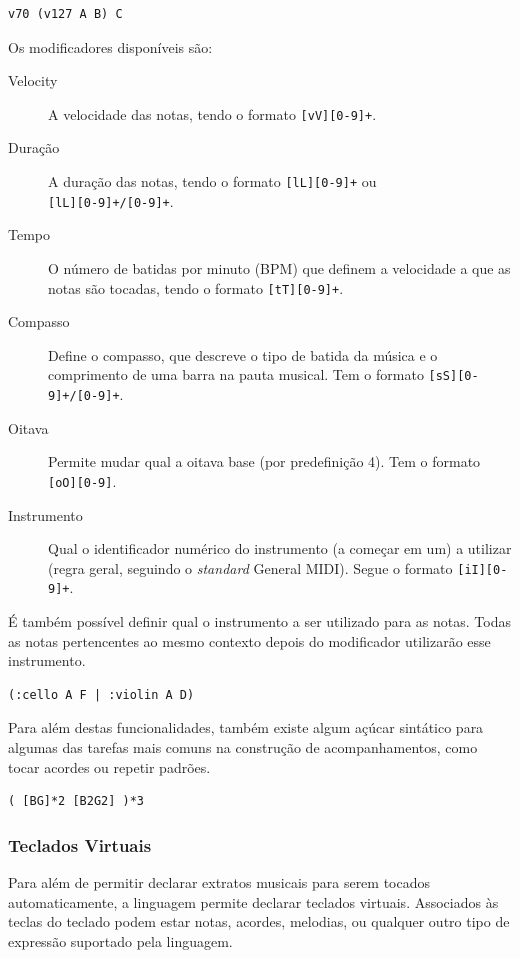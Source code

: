 \begin{lstlisting}
v70 (v127 A B) C
\end{lstlisting}

Os modificadores disponíveis são:
\begin{description}
\item[Velocity] A velocidade das notas, tendo o formato \texttt{[vV][0-9]+}.
\item[Duração] A duração das notas, tendo o formato \texttt{[lL][0-9]+} ou \\ \texttt{[lL][0-9]+/[0-9]+}.
\item[Tempo] O número de batidas por minuto (BPM) que definem a velocidade a que as notas são tocadas, tendo o formato \texttt{[tT][0-9]+}.
\item[Compasso] Define o compasso, que descreve o tipo de batida da música e o comprimento de uma barra na pauta musical. Tem o formato \texttt{[sS][0-9]+/[0-9]+}.
\item[Oitava] Permite mudar qual a oitava base (por predefinição 4). Tem o formato \texttt{[oO][0-9]}.
\item[Instrumento] Qual o identificador numérico do instrumento (a começar em um) a utilizar (regra geral, seguindo o \textit{standard} General MIDI). Segue o formato \texttt{[iI][0-9]+}.
\end{description}

É também possível definir qual o instrumento a ser utilizado para as notas. Todas as notas pertencentes ao mesmo contexto depois do modificador utilizarão esse instrumento.

\begin{lstlisting}
(:cello A F | :violin A D)
\end{lstlisting}

Para além destas funcionalidades, também existe algum açúcar sintático para algumas das tarefas mais comuns na construção de acompanhamentos, como tocar acordes ou repetir padrões.

\begin{lstlisting}
( [BG]*2 [B2G2] )*3
\end{lstlisting}

\subsubsection{Teclados Virtuais}
Para além de permitir declarar extratos musicais para serem tocados automaticamente, a linguagem permite declarar teclados virtuais. Associados às teclas do teclado podem estar notas, acordes, melodias, ou qualquer outro tipo de expressão suportado pela linguagem.


